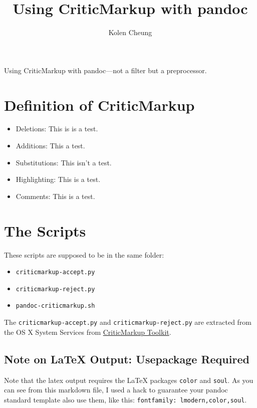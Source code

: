 \documentclass[]{article}
\title{Using CriticMarkup with pandoc}
\author{Kolen Cheung}
\date{}
\providecommand{\tightlist}{%
  \setlength{\itemsep}{0pt}\setlength{\parskip}{0pt}}
\begin{document}
\maketitle

Using CriticMarkup with pandoc---not a filter but a preprocessor.

\section{Definition of CriticMarkup}\label{definition-of-criticmarkup}

\begin{itemize}
\tightlist
\item
  Deletions: This is is a test.
\item
  Additions: This a test.
\item
  Substitutions: This isn't a test.
\item
  Highlighting: This is a test.
\item
  Comments: This is a test.
\end{itemize}

\section{The Scripts}\label{the-scripts}

These scripts are supposed to be in the same folder:

\begin{itemize}
\tightlist
\item
  \texttt{criticmarkup-accept.py}
\item
  \texttt{criticmarkup-reject.py}
\item
  \texttt{pandoc-criticmarkup.sh}
\end{itemize}

The \texttt{criticmarkup-accept.py} and \texttt{criticmarkup-reject.py}
are extracted from the OS X System Services from
\href{http://criticmarkup.com/services.php}{CriticMarkup Toolkit}.

\subsection{Note on LaTeX Output: Usepackage
Required}\label{note-on-latex-output-usepackage-required}

Note that the latex output requires the LaTeX packages \texttt{color}
and \texttt{soul}. As you can see from this markdown file, I used a hack
to guarantee your pandoc standard template also use them, like this:
\texttt{fontfamily:\ lmodern,color,soul}.
\end{document}

